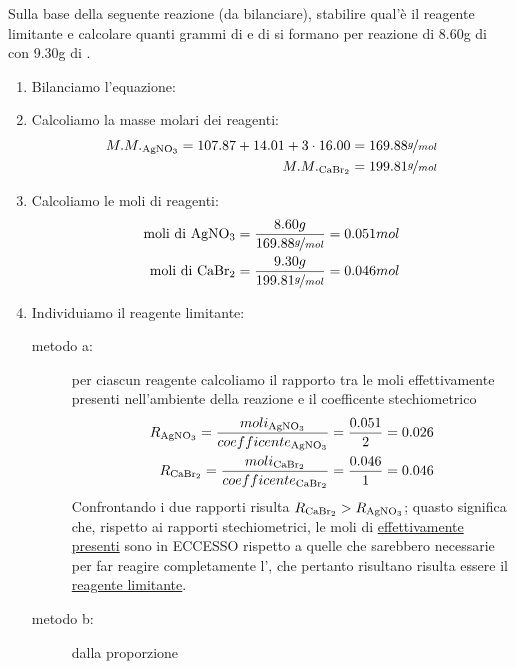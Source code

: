 \begin{ess}
  Sulla base della seguente reazione (da bilanciare), stabilire qual'è il reagente limitante e calcolare
  quanti grammi di  e di  si formano per reazione di 8.60g di  con 9.30g
  di .
  \begin{center}
  \end{center}
  \begin{enumerate}
  \item Bilanciamo l'equazione:
  \item Calcoliamo la masse molari dei reagenti:
    \begin{eqnarray*}
      M.M._{\ce{AgNO3}}=107.87+14.01+3\cdot 16.00=169.88 \nicefrac{g}{mol}\\
      M.M._{\ce{CaBr2}}=199.81 \nicefrac{g}{mol}
    \end{eqnarray*}
  \item Calcoliamo le moli di reagenti:
    \begin{eqnarray*}
      \text{moli di \ce{AgNO3}} = \frac{8.60g}{169.88\nicefrac{g}{mol}}=0.051mol\\
      \text{moli di \ce{CaBr2}} = \frac{9.30g}{199.81\nicefrac{g}{mol}}=0.046mol
    \end{eqnarray*}
  \item Individuiamo il reagente limitante:
    \begin{description}
    \item[metodo a:] per ciascun reagente calcoliamo il rapporto tra le moli effettivamente presenti
      nell'ambiente della reazione e il coefficente stechiometrico
      \begin{eqnarray*}
        R_{\ce{AgNO3}}=\frac{moli_{\ce{AgNO3}}}{coefficente_{\ce{AgNO3}}}=\frac{0.051}{2}=0.026\\
        R_{\ce{CaBr2}} = \frac{moli_{\ce{CaBr2}}}{coefficente_{\ce{CaBr2}}}=\frac{0.046}{1}=0.046
      \end{eqnarray*}
      Confrontando i due rapporti risulta $R_{\ce{CaBr2}}>R_{\ce{AgNO3}}$; quasto significa che, rispetto
      ai rapporti stechiometrici, le moli di  \underline{effettivamente presenti} sono in
      ECCESSO rispetto a quelle che sarebbero necessarie per far reagire completamente l',
      che pertanto risultano risulta essere il \underline{reagente limitante}.
    \item[metodo b:] dalla proporzione
      \begin{eqnarray*}

\end{eqnarray*}
\end{description}
\end{enumerate}
\end{ess}
